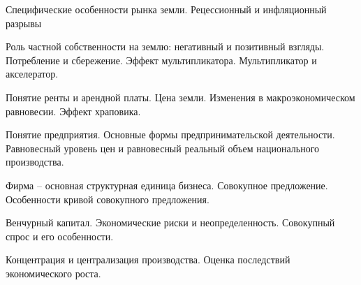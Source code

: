 \documentclass[
	14pt,
	a4paper,
	]
	{scrartcl}
\begin{document}
\vfill
\z 	Специфические особенности рынка земли.
 \vfill
\z 	Рецессионный и инфляционный разрывы
 \vfill

\vfill

\newpage


\shapk
{}
\setcounter{zad}{0}

\vfill
\z 	Роль частной собственности на землю: негативный и позитивный взгляды.
 \vfill
\z 	Потребление и сбережение. Эффект мультипликатора. Мультипликатор и акселератор.
 \vfill

\vfill

\newpage


\shapk
{}
\setcounter{zad}{0}

\vfill
\z 	Понятие ренты и арендной платы. Цена земли.
 \vfill
\z 	Изменения в макроэкономическом равновесии.  Эффект храповика.
 \vfill

\vfill

\newpage


\shapk
{}
\setcounter{zad}{0}

\vfill
\z 	Понятие предприятия. Основные формы предпринимательской деятельности.
 \vfill
\z 	Равновесный уровень цен и равновесный реальный объем национального производства.
 \vfill

\vfill

\newpage


\shapk
{}
\setcounter{zad}{0}

\vfill
\z 	Фирма – основная структурная единица бизнеса.
 \vfill
\z 	Совокупное предложение. Особенности кривой совокупного предложения.
 \vfill

\vfill

\newpage


\shapk
{}
\setcounter{zad}{0}

\vfill
\z 	Венчурный капитал. Экономические риски и неопределенность.
 \vfill
\z 	Совокупный спрос и его особенности.
 \vfill

\vfill

\newpage


\shapk
{}
\setcounter{zad}{0}

\vfill
\z 	Концентрация и централизация производства.
 \vfill
\z 	Оценка последствий экономического роста.
 \vfill

\vfill

\newpage


\shapk
{}
\setcounter{zad}{0}
\end{document}
